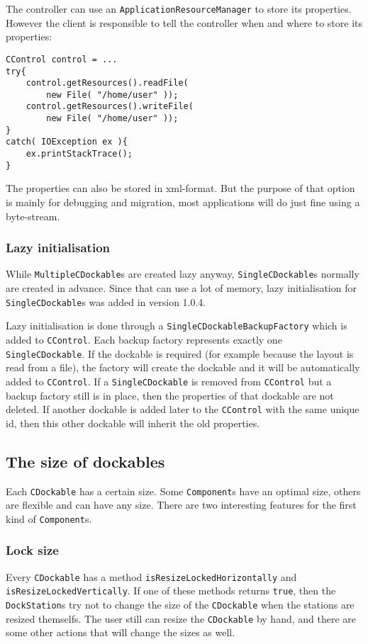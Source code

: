 \documentclass[a4paper,10pt]{article}
\newcommand{\src}[1]{\lstinline[basicstyle=\ttfamily]|#1|}
\begin{document}
The controller can use an \src{ApplicationResourceManager} to store its properties. However the client is responsible to tell the controller when and where to store its properties:
\begin{lstlisting}
CControl control = ...
try{
	control.getResources().readFile(
		new File( "/home/user" ));
	control.getResources().writeFile(
		new File( "/home/user" ));
}
catch( IOException ex ){
	ex.printStackTrace();
}
\end{lstlisting}
The properties can also be stored in xml-format. But the purpose of that option is mainly for debugging and migration, most applications will do just fine using a byte-stream.

\subsubsection{Lazy initialisation}
While \src{MultipleCDockable}s are created lazy anyway, \src{SingleCDockable}s normally are created in advance. Since that can use a lot of memory, lazy initialisation for \src{SingleCDockable}s was added in version 1.0.4.

Lazy initialisation is done through a \src{SingleCDockableBackupFactory} which is added to \src{CControl}. Each backup factory represents exactly one \\\src{SingleCDockable}. If the dockable is required (for example because the layout is read from a file), the factory will create the dockable and it will be automatically added to \src{CControl}. If a \src{SingleCDockable} is removed from \src{CControl} but a backup factory still is in place, then the properties of that dockable are not deleted. If another dockable is added later to the \src{CControl} with the same unique id, then this other dockable will inherit the old properties.

\subsection{The size of dockables}
Each \src{CDockable} has a certain size. Some \src{Component}s have an optimal size, others are flexible and can have any size. There are two interesting features for the first kind of \src{Component}s.

\subsubsection{Lock size}
Every \src{CDockable} has a method \src{isResizeLockedHorizontally} and \\\src{isResizeLockedVertically}. If one of these methods returns \src{true}, then the \src{DockStation}s try not to change the size of the \src{CDockable} when the stations are resized themselfs. The user still can resize the \src{CDockable} by hand, and there are some other actions that will change the sizes as well.
\end{document}
